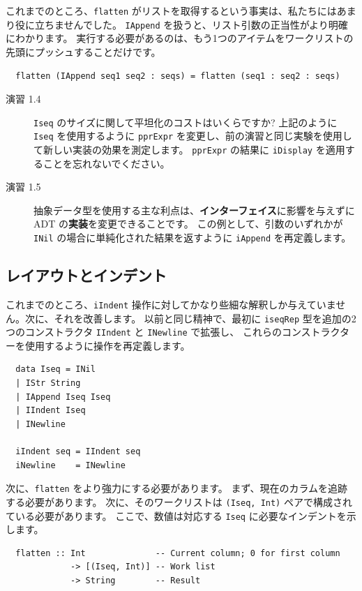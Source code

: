 \documentclass{jbook}
\begin{document}
これまでのところ、\texttt{flatten} がリストを取得するという事実は、私たちにはあまり役に立ちませんでした。
\texttt{IAppend} を扱うと、リスト引数の正当性がより明確にわかります。
実行する必要があるのは、もう1つのアイテムをワークリストの先頭にプッシュすることだけです。

\begin{verbatim}
  flatten (IAppend seq1 seq2 : seqs) = flatten (seq1 : seq2 : seqs)
\end{verbatim}

\begin{description}
	\item[演習 1.4] \texttt{Iseq} のサイズに関して平坦化のコストはいくらですか?
		上記のように \texttt{Iseq} を使用するように \texttt{pprExpr} を変更し、前の演習と同じ実験を使用して新しい実装の効果を測定します。
		\texttt{pprExpr} の結果に \texttt{iDisplay} を適用することを忘れないでください。

	\item[演習 1.5] 抽象データ型を使用する主な利点は、\textbf{インターフェイス}に影響を与えずに ADT の\textbf{実装}を変更できることです。
		この例として、引数のいずれかが \texttt{INil} の場合に単純化された結果を返すように \texttt{iAppend} を再定義します。
\end{description}

\subsection{レイアウトとインデント}

これまでのところ、\texttt{iIndent} 操作に対してかなり些細な解釈しか与えていません。次に、それを改善します。
以前と同じ精神で、最初に \texttt{iseqRep} 型を追加の2つのコンストラクタ \texttt{IIndent} と \texttt{INewline} で拡張し、
これらのコンストラクターを使用するように操作を再定義します。

\begin{verbatim}
  data Iseq = INil
  | IStr String
  | IAppend Iseq Iseq
  | IIndent Iseq
  | INewline

  iIndent seq = IIndent seq
  iNewline    = INewline
\end{verbatim}

次に、\texttt{flatten} をより強力にする必要があります。
まず、現在のカラムを追跡する必要があります。
次に、そのワークリストは \texttt{(Iseq, Int)} ペアで構成されている必要があります。
ここで、数値は対応する \texttt{Iseq} に必要なインデントを示します。

\begin{verbatim}
  flatten :: Int              -- Current column; 0 for first column
             -> [(Iseq, Int)] -- Work list
             -> String        -- Result
\end{verbatim}
\end{document}
